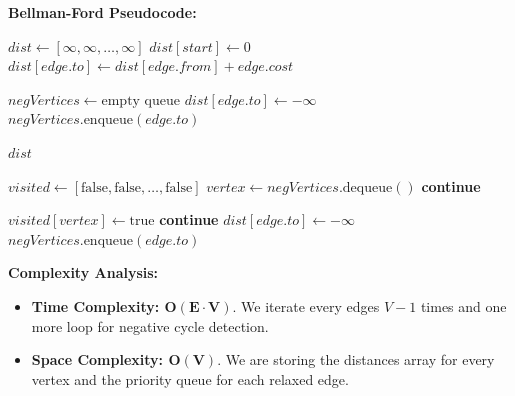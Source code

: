 \textbf{Bellman-Ford Pseudocode:}
\begin{algorithm}[H]
\caption{Bellman-Ford Algorithm}
\begin{algorithmic}[1]
    \State $dist \gets [\infty, \infty, \dots , \infty]$ 
    \State $dist[start] \gets 0$
                \State $dist[edge.to] \gets dist[edge.from] + edge.cost$
            \EndIf
        \EndFor
    \EndFor
    
    \State $negVertices \gets \text{empty queue}$
            \State $dist[edge.to] \gets -\infty$
            \State $negVertices.\text{enqueue}(edge.to)$
        \EndIf
    \EndFor
    
    \State {}
    \State \Return $dist$
\EndFunction

    \State $visited \gets [\text{false}, \text{false}, \dots , \text{false}]$ 
        \State $vertex \gets negVertices.\text{dequeue}()$
            \State \textbf{continue}
        \EndIf
        \State {}
    \EndWhile
\EndFunction

    \State $visited[vertex] \gets \text{true}$
            \State \textbf{continue}
        \EndIf
        \State $dist[edge.to] \gets -\infty$
        \State $negVertices.\text{enqueue}(edge.to)$
        \State {}
    \EndFor
\EndFunction
\end{algorithmic}
\end{algorithm}

\textbf{Complexity Analysis:}
\begin{itemize}
    \item \textbf{Time Complexity: $\mathbf{O(E \cdot V)}$}. We iterate every edges $V - 1$ times and one more loop for negative cycle detection.
    \item \textbf{Space Complexity: $\mathbf{O(V)}$}. We are storing the distances array for every vertex and the priority queue for each relaxed edge.
\end{itemize}
